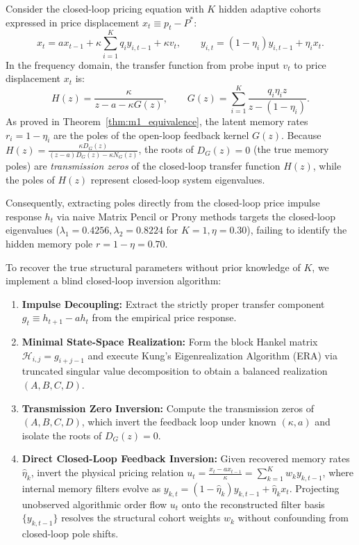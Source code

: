 \documentclass[12pt]{article}
\theoremstyle{definition}
\theoremstyle{remark}
\begin{document}
Consider the closed-loop pricing equation with $K$ hidden adaptive cohorts expressed in price displacement $x_t \equiv p_t - P^*$:
\begin{equation}
x_t = a x_{t-1} + \kappa \sum_{i=1}^K q_i y_{i,t-1} + \kappa v_t, \qquad y_{i,t} = (1 - \eta_i) y_{i,t-1} + \eta_i x_t.
\label{eq:closed_loop_pricing_displacement}
\end{equation}
In the frequency domain, the transfer function from probe input $v_t$ to price displacement $x_t$ is:
\begin{equation}
H(z) = \frac{\kappa}{z - a - \kappa G(z)}, \qquad G(z) = \sum_{i=1}^K \frac{q_i \eta_i z}{z - (1 - \eta_i)}.
\label{eq:closed_loop_H_transfer}
\end{equation}
As proved in Theorem~\ref{thm:m1_equivalence}, the latent memory rates $r_i = 1 - \eta_i$ are the poles of the open-loop feedback kernel $G(z)$. Because $H(z) = \frac{\kappa D_G(z)}{(z - a)D_G(z) - \kappa N_G(z)}$, the roots of $D_G(z) = 0$ (the true memory poles) are \emph{transmission zeros} of the closed-loop transfer function $H(z)$, while the poles of $H(z)$ represent closed-loop system eigenvalues.

Consequently, extracting poles directly from the closed-loop price impulse response $h_t$ via naive Matrix Pencil or Prony methods targets the closed-loop eigenvalues ($\lambda_1 = 0.4256, \lambda_2 = 0.8224$ for $K=1, \eta = 0.30$), failing to identify the hidden memory pole $r = 1 - \eta = 0.70$.

To recover the true structural parameters without prior knowledge of $K$, we implement a blind closed-loop inversion algorithm:
\begin{enumerate}
\item \textbf{Impulse Decoupling:} Extract the strictly proper transfer component $g_t \equiv h_{t+1} - a h_t$ from the empirical price response.
\item \textbf{Minimal State-Space Realization:} Form the block Hankel matrix $\mathcal{H}_{i,j} = g_{i+j-1}$ and execute Kung's Eigenrealization Algorithm (ERA) via truncated singular value decomposition to obtain a balanced realization $(A, B, C, D)$.
\item \textbf{Transmission Zero Inversion:} Compute the transmission zeros of $(A, B, C, D)$, which invert the feedback loop under known $(\kappa, a)$ and isolate the roots of $D_G(z) = 0$.
\item \textbf{Direct Closed-Loop Feedback Inversion:} Given recovered memory rates $\hat{\eta}_k$, invert the physical pricing relation $u_t = \frac{x_t - a x_{t-1}}{\kappa} = \sum_{k=1}^K w_k y_{k,t-1}$, where internal memory filters evolve as $y_{k,t} = (1 - \hat{\eta}_k) y_{k,t-1} + \hat{\eta}_k x_t$. Projecting unobserved algorithmic order flow $u_t$ onto the reconstructed filter basis $\{y_{k,t-1}\}$ resolves the structural cohort weights $w_k$ without confounding from closed-loop pole shifts.
\end{enumerate}
\end{document}
